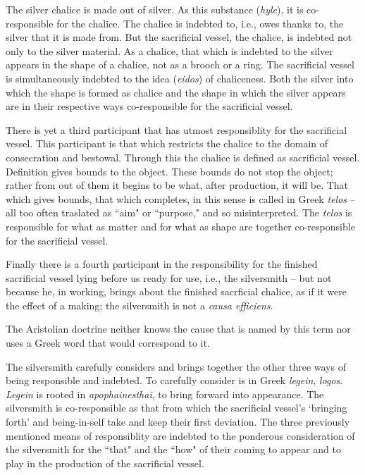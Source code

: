 \documentclass[paper=a4, fontsize=11pt,twoside]{scrartcl}
\begin{document}
The silver chalice is made out of silver. As this substance (\textit{hyle}), it is co-responsible for the chalice. The chalice is indebted to, i.e., owes thanks to, the silver that it is made from. But the sacrificial vessel, the chalice, is indebted not only to the silver material. As a chalice, that which is indebted to the silver appears in the shape of a chalice, not as a brooch or a ring. The sacrificial vessel is simultaneously indebted to the idea (\textit{eidos}) of chaliceness. Both the silver into which the shape is formed as chalice and the shape in which the silver appears are in their respective ways co-responsible for the sacrificial vessel.

There is yet a third participant that has utmost responsiblity for the sacrificial vessel. This participant is that which restricts the chalice to the domain of consecration and bestowal. Through this the chalice is defined as sacrificial vessel. Definition gives bounds to the object. These bounds do not stop the object; rather from out of them it begins to be what, after production, it will be. That which gives bounds, that which completes, in this sense is called in Greek \textit{telos} -- all too often traslated as ``aim" or ``purpose," and so misinterpreted. The \textit{telos} is responsible for what as matter and for what as shape are together co-responsible for the sacrificial vessel.

Finally there is a fourth participant in the responsibility for the finished sacrificial vessel lying before us ready for use, i.e., the silversmith -- but not because he, in working, brings about the finished sacrficial chalice, as if it were the effect of a making; the silversmith is not a \textit{causa efficiens}.

The Aristolian doctrine neither knows the cause that is named by this term nor uses a Greek word that would correspond to it.

The silversmith carefully considers and brings together the other three ways of being responsible and indebted. To carefully consider is in Greek \textit{legein}, \textit{logos}. \textit{Legein} is rooted in \textit{apophainesthai}, to bring forward into appearance. The silversmith is co-responsible as that from which the sacrificial vessel's `bringing forth' and being-in-self take and keep their first deviation. The three previously mentioned means of responsiblity are indebted to the ponderous consideration of the silversmith for the ``that" and the ``how" of their coming to appear and to play in the production of the sacrificial vessel.
\end{document}
